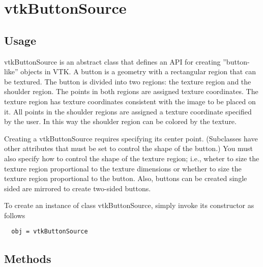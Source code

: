 \section{vtkButtonSource}

\subsection{Usage}

 vtkButtonSource is an abstract class that defines an API for creating
 ''button-like'' objects in VTK. A button is a geometry with a rectangular
 region that can be textured. The button is divided into two regions: the
 texture region and the shoulder region. The points in both regions are
 assigned texture coordinates. The texture region has texture coordinates
 consistent with the image to be placed on it.  All points in the shoulder
 regions are assigned a texture coordinate specified by the user.  In this
 way the shoulder region can be colored by the texture.

 Creating a vtkButtonSource requires specifying its center point. 
 (Subclasses have other attributes that must be set to control 
 the shape of the button.) You must also specify how to control
 the shape of the texture region; i.e., wheter to size the
 texture region proportional to the texture dimensions or whether
 to size the texture region proportional to the button. Also, buttons
 can be created single sided are mirrored to create two-sided buttons.

To create an instance of class vtkButtonSource, simply
invoke its constructor as follows
\begin{verbatim}
  obj = vtkButtonSource
\end{verbatim}
\subsection{Methods}

